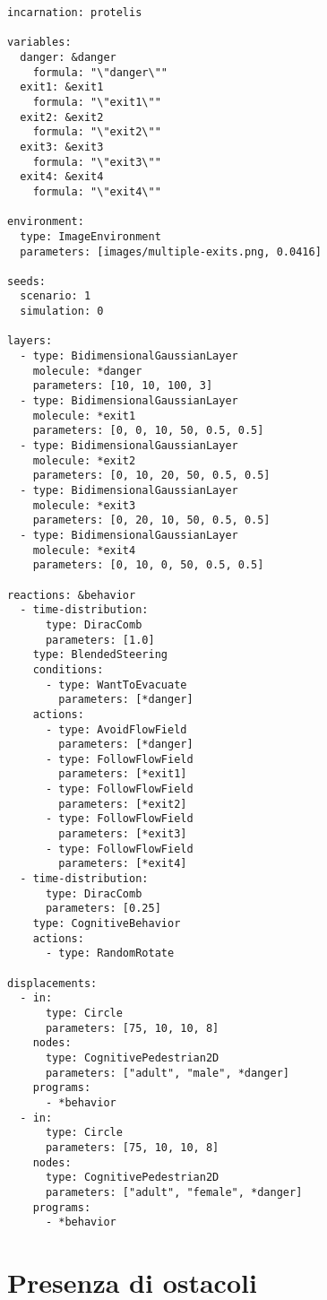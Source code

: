 \begin{verbatim}
incarnation: protelis

variables:
  danger: &danger
    formula: "\"danger\""
  exit1: &exit1
    formula: "\"exit1\""
  exit2: &exit2
    formula: "\"exit2\""
  exit3: &exit3
    formula: "\"exit3\""
  exit4: &exit4
    formula: "\"exit4\""

environment:
  type: ImageEnvironment
  parameters: [images/multiple-exits.png, 0.0416]

seeds:
  scenario: 1
  simulation: 0

layers:
  - type: BidimensionalGaussianLayer
    molecule: *danger
    parameters: [10, 10, 100, 3]
  - type: BidimensionalGaussianLayer
    molecule: *exit1
    parameters: [0, 0, 10, 50, 0.5, 0.5]
  - type: BidimensionalGaussianLayer
    molecule: *exit2
    parameters: [0, 10, 20, 50, 0.5, 0.5]
  - type: BidimensionalGaussianLayer
    molecule: *exit3
    parameters: [0, 20, 10, 50, 0.5, 0.5]
  - type: BidimensionalGaussianLayer
    molecule: *exit4
    parameters: [0, 10, 0, 50, 0.5, 0.5]

reactions: &behavior
  - time-distribution:
      type: DiracComb
      parameters: [1.0]
    type: BlendedSteering
    conditions:
      - type: WantToEvacuate
        parameters: [*danger]
    actions:
      - type: AvoidFlowField
        parameters: [*danger]
      - type: FollowFlowField
        parameters: [*exit1]
      - type: FollowFlowField
        parameters: [*exit2]
      - type: FollowFlowField
        parameters: [*exit3]
      - type: FollowFlowField
        parameters: [*exit4]
  - time-distribution:
      type: DiracComb
      parameters: [0.25]
    type: CognitiveBehavior
    actions:
      - type: RandomRotate

displacements:
  - in:
      type: Circle
      parameters: [75, 10, 10, 8]
    nodes:
      type: CognitivePedestrian2D
      parameters: ["adult", "male", *danger]
    programs:
      - *behavior
  - in:
      type: Circle
      parameters: [75, 10, 10, 8]
    nodes:
      type: CognitivePedestrian2D
      parameters: ["adult", "female", *danger]
    programs:
      - *behavior
\end{verbatim}

\section{Presenza di ostacoli}

